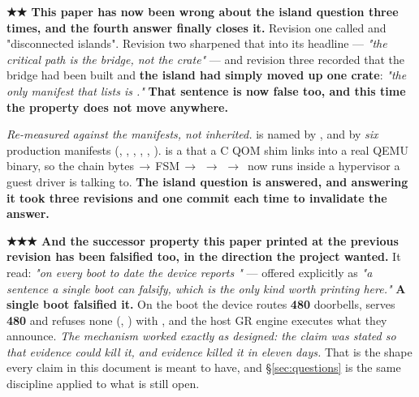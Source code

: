 \documentclass[10.5pt]{article}
\begin{document}
\begin{claimbox}\small
\textbf{★★ This paper has now been wrong about the island question three times, and the fourth
answer finally closes it.} Revision one called  and 
"disconnected islands". Revision two sharpened that into its headline — \emph{"the critical path
is the bridge, not the crate"} — and revision three recorded that the bridge had been built and
\textbf{the island had simply moved up one crate}: \emph{"the only manifest that lists
 is ."} \textbf{That sentence is now false too, and
this time the property does not move anywhere.}

\smallskip
\emph{Re-measured against the manifests, not inherited.}  is named by
, and  by \emph{six} production
manifests (, , , , ,
).  is a  that a C QOM shim links into a real
QEMU binary, so the chain
bytes\,$\rightarrow$\,FSM\,$\rightarrow$\,\,$\rightarrow$\,\,$\rightarrow$\,
now runs inside a hypervisor a guest driver is talking to. \textbf{The island question is
answered, and answering it took three revisions and one commit each time to invalidate the
answer.}

\smallskip
\textbf{★★★ And the successor property this paper printed at the previous revision has been
falsified too, in the direction the project wanted.} It read: \emph{"on every boot to date the
device reports "} — offered explicitly as \emph{"a sentence a single
boot can falsify, which is the only kind worth printing here."} \textbf{A single boot falsified
it.} On the  boot the device routes \textbf{480} doorbells, serves \textbf{480} and refuses none (,
) with , and the host GR engine executes what they announce. \emph{The mechanism worked exactly as designed: the claim was stated so that
evidence could kill it, and evidence killed it in eleven days.} That is the shape every claim in
this document is meant to have, and \S\ref{sec:questions} is the same discipline applied to what
is still open.
\end{claimbox}
\end{document}
